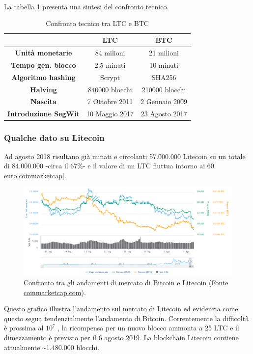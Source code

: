  La tabella \ref{ltcvsbtc} presenta una sintesi del confronto tecnico.
\cite{litecoinreview}
\begin{table}
\begin{tabular}{|c|c|c|}
	\hline 
	& \textbf{LTC} & \textbf{BTC} \\ 
	\hline 
\textbf{Unità monetarie}& 84 milioni & 21 milioni \\ 
	\hline 
\textbf{Tempo gen. blocco}	& 2.5 minuti & 10 minuti \\ 
	\hline 
\textbf{Algoritmo hashing}	& Scrypt & SHA256 \\ 
	\hline 
\textbf{Halving}	& 840000 blocchi & 210000 blocchi \\ 
	\hline 
\textbf{Nascita}	& 7 Ottobre 2011 & 2 Gennaio 2009 \\ 
	\hline 
\textbf{Introduzione SegWit} & 10 Maggio 2017 & 23 Agosto 2017 \\
\hline
\end{tabular}
\caption{Confronto tecnico tra LTC e BTC}
\label{ltcvsbtc}
\end{table} 

\subsubsection{Qualche dato su Litecoin}
Ad agosto 2018 risultano già minati e circolanti 57.000.000 Litecoin su un totale di 84.000.000 -circa il 67\%- e il valore di un LTC fluttua intorno ai 60 euro\ref{coinmarketcap}.

\begin{figure}[h!]
	\centering
	\includegraphics[width=1.0\linewidth]{images/LitecoinCoinMarketCap}
	\caption{Confronto tra gli andamenti di mercato di Bitcoin e Litecoin (Fonte \url{coinmarketcap.com}).}
	\label{fig:litecoincoinmarketcap}
\end{figure}


Questo grafico illustra l’andamento sul mercato di Litecoin ed evidenzia come questo segua tendenzialmente l’andamento di Bitcoin.
Correntemente la difficoltà è prossima al $10^{7}$   \cite{bitcoinwisdom}, la ricompensa per un nuovo blocco ammonta a 25 LTC e il dimezzamento è previsto per il 6 agosto 2019.
La blockchain Litecoin contiene attualmente \~{}1.480.000 blocchi.

